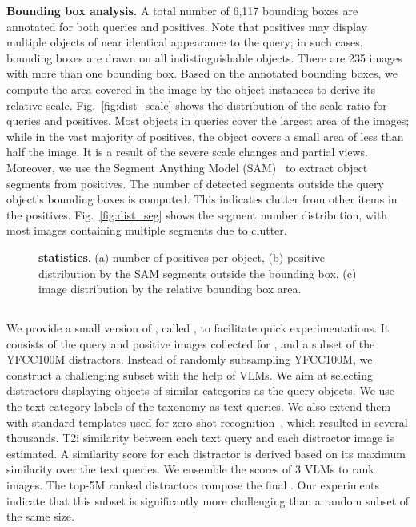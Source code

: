 \noindent\textbf{Bounding box analysis.} A total number of 6,117 bounding boxes are annotated for both queries and positives. Note that positives may display multiple objects of near identical appearance to the query; in such cases, bounding boxes are drawn on all indistinguishable objects. There are 235 images with more than one bounding box.
%
Based on the annotated bounding boxes, we compute the area covered in the image by the object instances to derive its relative scale. Fig.~\ref{fig:dist_scale} shows the distribution of the scale ratio for queries and positives. Most objects in queries cover the largest area of the images; while in the vast majority of positives, the object covers a small area of less than half the image. It is a result of the severe scale changes and partial views. 
%
Moreover, we use the Segment Anything Model (SAM)~\cite{kmr+23,rgh+24} to extract object segments from positives. The number of detected segments outside the query object's bounding boxes is computed. This indicates clutter from other items in the positives. Fig.~\ref{fig:dist_seg} shows the segment number distribution, with most images containing multiple segments due to clutter.

\begin{figure}[t]
    
    \vspace{-15pt}
    \caption{\textbf{\ours statistics}. (a) number of positives per object, (b) positive distribution by the SAM segments outside the bounding box, (c) image distribution by the relative bounding box area.
    \label{fig:statistics}
    \vspace{-15pt}
    }
\end{figure}

\subsection{\miniours}
\label{sec:mini}
We provide a small version of \ours, called \miniours, to facilitate quick experimentations. 
It consists of the query and positive images collected for \ours, and a subset of the YFCC100M distractors.
Instead of randomly subsampling YFCC100M, we construct a challenging subset with the help of VLMs.
We aim at selecting distractors displaying objects of similar categories as the query objects.
We use the text category labels of the taxonomy as text queries. We also extend them with standard templates used for zero-shot recognition~\cite{clip}, which resulted in several thousands. T2i similarity between each text query and each distractor image is estimated. A similarity score for each distractor is derived based on its maximum similarity over the text queries. We ensemble the scores of 3 VLMs to rank images. The top-5M ranked distractors compose the final \miniours. 
Our experiments indicate that this subset is significantly more challenging than a random subset of the same size.
